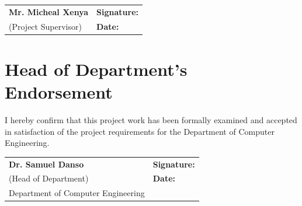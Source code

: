 \vspace{1.5cm}

\noindent
\begin{tabular}{p{7.5cm}p{7.5cm}}
\textbf{Mr. Micheal Xenya} & \textbf{Signature:} \hrulefill \\[0.2cm]
(Project Supervisor) & \textbf{Date:} \hrulefill \\
\end{tabular}

\vspace{1.8cm}

\section*{Head of Department's Endorsement}
I hereby confirm that this project work has been formally examined and accepted in satisfaction of the project requirements for the Department of Computer Engineering.

\vspace{1.5cm}

\noindent
\begin{tabular}{p{7.5cm}p{7.5cm}}
\textbf{Dr. Samuel Danso} & \textbf{Signature:} \hrulefill \\[0.2cm]
(Head of Department) & \textbf{Date:} \hrulefill \\
Department of Computer Engineering & \\
\end{tabular}
